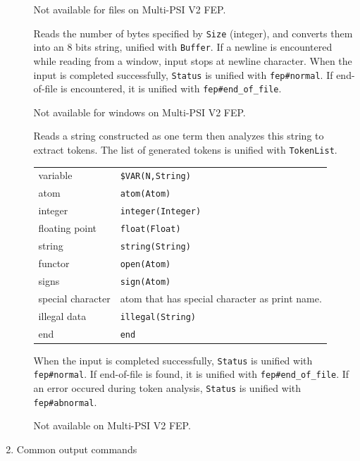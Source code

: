 \begin{enumerate}
\begin{itemize}
\Caution Not available for files on Multi-PSI V2 FEP.

Reads the number of bytes specified by \verb|Size| (integer),
and converts them into an 8 bits
string, unified with \verb|Buffer|. If a newline is encountered while
reading from a window, input stops at newline character.
When the input is completed successfully, \verb|Status| is unified with
\verb|fep#normal|. If end-of-file is encountered,
it is unified with \verb|fep#end_of_file|.

\Caution Not available for windows on Multi-PSI V2 FEP.

Reads a string constructed as one term then analyzes this string
to extract tokens. The list of generated tokens is unified with
\verb|TokenList|.

\vspace{1ex}
\hspace*{15mm}\begin{tabular}{l@{ :: }l}
variable          & \verb|$VAR(N,String)|\\
atom              & \verb|atom(Atom)|\\
integer           & \verb|integer(Integer)|\\
floating point    & \verb|float(Float)|\\
string            & \verb|string(String)|\\
functor           & \verb|open(Atom)|\\
signs             & \verb|sign(Atom)|\\
special character & atom that has special character as print name.\\
illegal data      & \verb|illegal(String)|\\
end               & \verb|end|\\
\end{tabular}

\vspace{1ex}
When the input is completed successfully, \verb|Status| is unified with
\verb|fep#normal|. If end-of-file is found, it is unified with
\verb|fep#end_of_file|. If an error occured during token
analysis, \verb|Status| is unified with \verb|fep#abnormal|.

\Caution Not available on Multi-PSI V2 FEP.

\end{itemize}
\item Common output commands\\


\end{enumerate}
